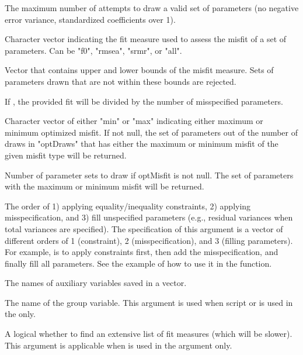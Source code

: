 \documentclass[a4paper]{book}
\begin{document}
\begin{Arguments}
\begin{ldescription}
\item[\code{maxDraw}]  
The maximum number of attempts to draw a valid set of parameters (no negative error variance, standardized coefficients over 1).

\item[\code{misfitType}]  
Character vector indicating the fit measure used to assess the misfit of a set of parameters. Can be "f0", "rmsea", "srmr", or "all". 

\item[\code{misfitBounds}]  
Vector that contains upper and lower bounds of the misfit measure. Sets of parameters drawn that are not within these bounds are rejected.

\item[\code{averageNumMisspec}]  
If , the provided fit will be divided by the number of misspecified parameters. 

\item[\code{optMisfit}]  
Character vector of either "min" or "max" indicating either maximum or minimum optimized misfit. If not null, the set of parameters out of the number of draws in "optDraws" that has either the maximum or minimum misfit of the given misfit type will be returned.

\item[\code{optDraws}]  
Number of parameter sets to draw if optMisfit is not null. The set of parameters with the maximum or minimum misfit will be returned.

\item[\code{createOrder}] 
The order of 1) applying equality/inequality constraints, 2) applying misspecification, and 3) fill unspecified parameters (e.g., residual variances when total variances are specified). The specification of this argument is a vector of different orders of 1 (constraint), 2 (misspecification), and 3 (filling parameters). For example,  is to apply constraints first, then add the misspecification, and finally fill all parameters. See the example of how to use it in the  function.

\item[\code{aux}] 
The names of auxiliary variables saved in a vector.

\item[\code{group}] 
The name of the group variable. This argument is used when  script or  is used in the  only.

\item[\code{mxFit}] 
A logical whether to find an extensive list of fit measures (which will be slower). This argument is applicable when  is used in the  argument only.


\end{ldescription}
\end{Arguments}
\end{document}
